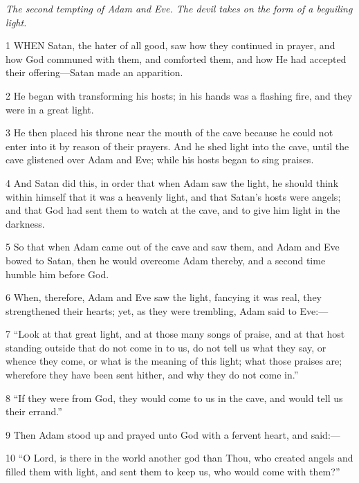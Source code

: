\par \textit{The second tempting of Adam and Eve. The devil takes on the form of a beguiling light.}

\par 1 WHEN Satan, the hater of all good, saw how they continued in prayer, and how God communed with them, and comforted them, and how He had accepted their offering—Satan made an apparition.

\par 2 He began with transforming his hosts; in his hands was a flashing fire, and they were in a great light.

\par 3 He then placed his throne near the mouth of the cave because he could not enter into it by reason of their prayers. And he shed light into the cave, until the cave glistened over Adam and Eve; while his hosts began to sing praises.

\par 4 And Satan did this, in order that when Adam saw the light, he should think within himself that it was a heavenly light, and that Satan's hosts were angels; and that God had sent them to watch at the cave, and to give him light in the darkness.

\par 5 So that when Adam came out of the cave and saw them, and Adam and Eve bowed to Satan, then he would overcome Adam thereby, and a second time humble him before God.

\par 6 When, therefore, Adam and Eve saw the light, fancying it was real, they strengthened their hearts; yet, as they were trembling, Adam said to Eve:—

\par 7 “Look at that great light, and at those many songs of praise, and at that host standing outside that do not come in to us, do not tell us what they say, or whence they come, or what is the meaning of this light; what those praises are; wherefore they have been sent hither, and why they do not come in.”

\par 8 “If they were from God, they would come to us in the cave, and would tell us their errand.”

\par 9 Then Adam stood up and prayed unto God with a fervent heart, and said:—

\par 10 “O Lord, is there in the world another god than Thou, who created angels and filled them with light, and sent them to keep us, who would come with them?”

